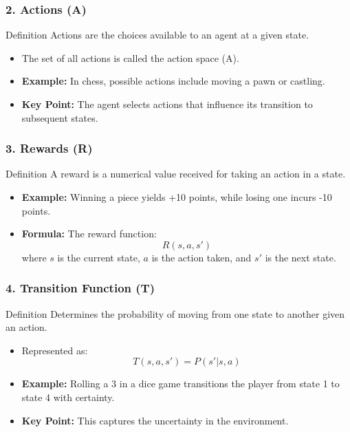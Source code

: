 \documentclass[aspectratio=169]{beamer}
\begin{document}
\begin{frame}[fragile]
    \frametitle{2. Actions (A)}
    \begin{block}{Definition}
        Actions are the choices available to an agent at a given state.
    \end{block}
    \begin{itemize}
        \item The set of all actions is called the action space (A).
        \item \textbf{Example:} In chess, possible actions include moving a pawn or castling.
        \item \textbf{Key Point:} The agent selects actions that influence its transition to subsequent states.
    \end{itemize}
\end{frame}

\begin{frame}[fragile]
    \frametitle{3. Rewards (R)}
    \begin{block}{Definition}
        A reward is a numerical value received for taking an action in a state.
    \end{block}
    \begin{itemize}
        \item \textbf{Example:} Winning a piece yields +10 points, while losing one incurs -10 points.
        \item \textbf{Formula:} The reward function:
        \begin{equation}
            R(s, a, s')
        \end{equation}
        where \(s\) is the current state, \(a\) is the action taken, and \(s'\) is the next state.
    \end{itemize}
\end{frame}

\begin{frame}[fragile]
    \frametitle{4. Transition Function (T)}
    \begin{block}{Definition}
        Determines the probability of moving from one state to another given an action.
    \end{block}
    \begin{itemize}
        \item Represented as:
        \begin{equation}
            T(s, a, s') = P(s' | s, a)
        \end{equation}
        \item \textbf{Example:} Rolling a 3 in a dice game transitions the player from state 1 to state 4 with certainty.
        \item \textbf{Key Point:} This captures the uncertainty in the environment.
    \end{itemize}
\end{frame}
\end{document}
